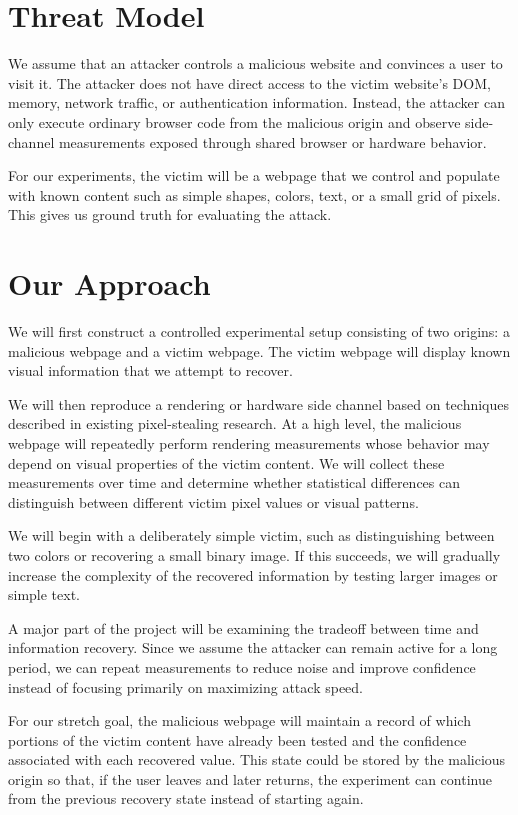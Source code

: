 \section{Threat Model}
\label{sec:threat}

We assume that an attacker controls a malicious website and convinces a user to visit it. The attacker does not have direct access to the victim website's DOM, memory, network traffic, or authentication information. Instead, the attacker can only execute ordinary browser code from the malicious origin and observe side-channel measurements exposed through shared browser or hardware behavior.

For our experiments, the victim will be a webpage that we control and populate with known content such as simple shapes, colors, text, or a small grid of pixels. This gives us ground truth for evaluating the attack.

\section{Our Approach}
\label{sec:approach}

We will first construct a controlled experimental setup consisting of two origins: a malicious webpage and a victim webpage. The victim webpage will display known visual information that we attempt to recover.

We will then reproduce a rendering or hardware side channel based on techniques described in existing pixel-stealing research. At a high level, the malicious webpage will repeatedly perform rendering measurements whose behavior may depend on visual properties of the victim content. We will collect these measurements over time and determine whether statistical differences can distinguish between different victim pixel values or visual patterns.

We will begin with a deliberately simple victim, such as distinguishing between two colors or recovering a small binary image. If this succeeds, we will gradually increase the complexity of the recovered information by testing larger images or simple text.

A major part of the project will be examining the tradeoff between time and information recovery. Since we assume the attacker can remain active for a long period, we can repeat measurements to reduce noise and improve confidence instead of focusing primarily on maximizing attack speed.

For our stretch goal, the malicious webpage will maintain a record of which portions of the victim content have already been tested and the confidence associated with each recovered value. This state could be stored by the malicious origin so that, if the user leaves and later returns, the experiment can continue from the previous recovery state instead of starting again.